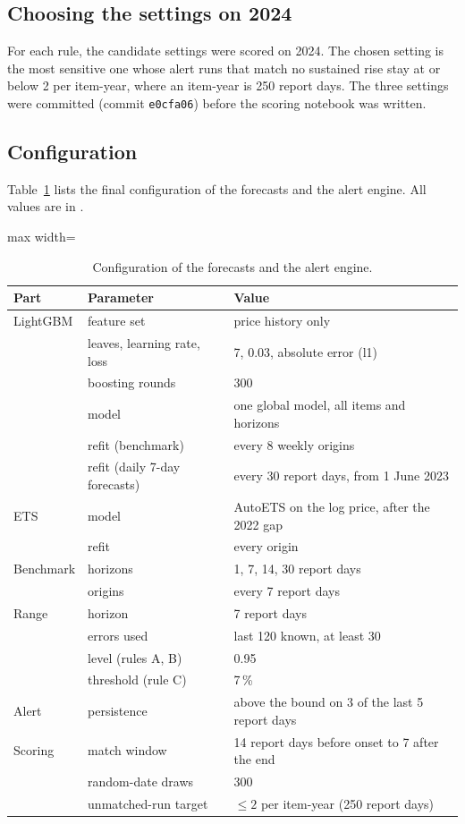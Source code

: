 \subsection{Choosing the settings on 2024}
For each rule, the candidate settings were scored on 2024. The chosen setting is the most sensitive one whose alert runs that match no sustained rise stay at or below 2 per item-year, where an item-year is 250 report days. The three settings were committed (commit \texttt{e0cfa06}) before the scoring notebook was written.

\subsection{Configuration}
Table~\ref{tab:config} lists the final configuration of the forecasts and the alert engine. All values are in .

\begin{table}[H]\centering\small
\caption[Configuration of the forecasts and the alert engine]{Configuration of the forecasts and the alert engine.}\label{tab:config}
\begin{adjustbox}{max width=\linewidth}\begin{tabular}{lll}
\toprule
\textbf{Part} & \textbf{Parameter} & \textbf{Value} \\
\midrule
LightGBM & feature set & price history only \\
 & leaves, learning rate, loss & 7, 0.03, absolute error (l1) \\
 & boosting rounds & 300 \\
 & model & one global model, all items and horizons \\
 & refit (benchmark) & every 8 weekly origins \\
 & refit (daily 7-day forecasts) & every 30 report days, from 1 June 2023 \\
ETS & model & AutoETS on the log price, after the 2022 gap \\
 & refit & every origin \\
Benchmark & horizons & 1, 7, 14, 30 report days \\
 & origins & every 7 report days \\
Range & horizon & 7 report days \\
 & errors used & last 120 known, at least 30 \\
 & level (rules A, B) & 0.95 \\
 & threshold (rule C) & 7\,\% \\
Alert & persistence & above the bound on 3 of the last 5 report days \\
Scoring & match window & 14 report days before onset to 7 after the end \\
 & random-date draws & 300 \\
 & unmatched-run target & $\leq 2$ per item-year (250 report days) \\
\bottomrule
\end{tabular}\end{adjustbox}
\end{table}

